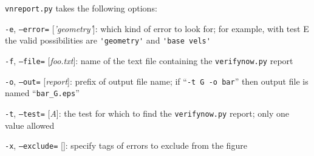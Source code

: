 \documentclass[11pt,final]{amsart}
\newcommand{\optoptdef}[3]{\vspace{1mm}\noindent \large\texttt{-#1},\,\,\texttt{--#2=}\normalsize\,\,[\textsl{#3}]:\quad}
\begin{document}
\verb|vnreport.py| takes the following options:

\optoptdef{e}{error}{'geometry'} which kind of error to look for; for example, with test E the valid possibilities are \verb|'geometry'| and \verb|'base vels'|

\optoptdef{f}{file}{foo.txt} name of the text file containing the \verb|verifynow.py| report

\optoptdef{o}{out}{report} prefix of output file name; if ``\verb|-t G -o bar|'' then output file is named ``\verb|bar_G.eps|''

\optoptdef{t}{test}{A} the test for which to find the \verb|verifynow.py| report; only one value allowed

\optoptdef{x}{exclude}{} specify tags of errors to exclude from the figure


\end{document}
